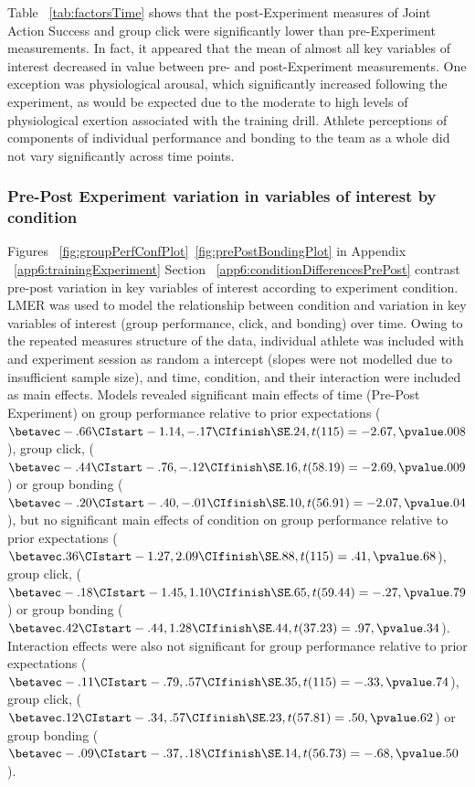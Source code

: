   \begin{landscape}
    \centering
      
   \end{landscape}
\restoregeometry

Table ~\ref{tab:factorsTime} shows that the post-Experiment measures of Joint Action Success and group click were significantly lower than pre-Experiment measurements.  In fact, it appeared that the mean of almost all key variables of interest decreased in value between pre- and post-Experiment measurements. One exception was physiological arousal, which significantly increased following the experiment, as would be expected due to the moderate to high levels of physiological exertion associated with the training drill.  Athlete perceptions of components of individual performance and bonding to the team as a whole did not vary significantly across time points.



\subsubsection{Pre-Post Experiment variation in variables of interest by condition}

Figures ~\ref{fig:groupPerfConfPlot}\nobreakdash~\ref{fig:prePostBondingPlot} in Appendix ~\ref{app6:trainingExperiment} Section ~\ref{app6:conditionDifferencesPrePost} contrast pre-post variation in key variables of interest according to experiment condition. LMER was used to model the relationship between condition and variation in key variables of interest (group performance, click, and bonding) over time. Owing to the repeated measures structure of the data, individual athlete was included with and experiment session as random a intercept (slopes were not modelled due to insufficient sample size), and time, condition, and their interaction were included as main effects. Models revealed significant main effects of time (Pre-Post Experiment) on group performance relative to prior expectations ($\betavec -.66 \CIstart -1.14, -.17 \CIfinish \SE .24, t(115) = -2.67, \pvalue .008 $), group click, ($\betavec -.44 \CIstart -.76, -.12 \CIfinish \SE .16, t(58.19) = -2.69, \pvalue .009 $) or group bonding ($\betavec -.20 \CIstart -.40, -.01 \CIfinish \SE .10, t(56.91) = -2.07, \pvalue .04$), but no significant main effects of condition on group performance relative to prior expectations ($\betavec .36 \CIstart -1.27, 2.09 \CIfinish \SE .88, t(115) = .41, \pvalue .68$), group click, ($\betavec -.18 \CIstart -1.45, 1.10 \CIfinish \SE .65, t(59.44) = -.27, \pvalue .79 $) or group bonding ($\betavec .42 \CIstart -.44, 1.28 \CIfinish \SE .44, t(37.23) = .97, \pvalue .34$).
Interaction effects were also not significant for group performance relative to prior expectations ($\betavec -.11 \CIstart -.79, .57 \CIfinish \SE .35, t(115) = -.33, \pvalue .74 $), group click, ($\betavec .12 \CIstart -.34, .57 \CIfinish \SE .23, t(57.81) = .50, \pvalue .62$) or group bonding ($\betavec -.09 \CIstart -.37, .18 \CIfinish \SE .14, t(56.73) = -.68, \pvalue .50$).

